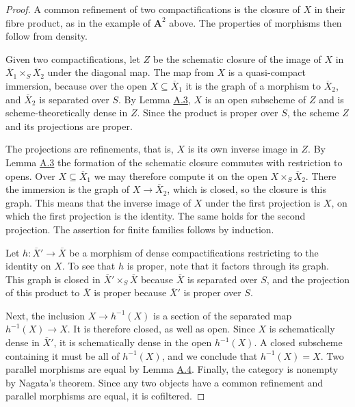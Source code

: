 \documentclass[11pt]{article}
\begin{document}
\begin{proof}[{Proof}]\label{bp20}%
A common refinement of two compactifications is the closure of \(X\) in their fibre product, as in the example of \(\mathbf A^2\) above. The properties of morphisms then follow from density.

Given two compactifications, let \(Z\) be the schematic closure of the image of \(X\) in \(\overline X_1\times_S\overline X_2\) under the diagonal map. The map from \(X\) is a quasi-compact immersion, because over the open \(X\subseteq\overline X_1\) it is the graph of a morphism to \(\overline X_2\), and \(\overline X_2\) is separated over \(S\). By Lemma \hyperref[bp9]{A.3}, \(X\) is an open subscheme of \(Z\) and is scheme-theoretically dense in \(Z\). Since the product is proper over \(S\), the scheme \(Z\) and its projections are proper.

The projections are refinements, that is, \(X\) is its own inverse image in \(Z\). By Lemma \hyperref[bp9]{A.3} the formation of the schematic closure commutes with restriction to opens. Over \(X\subseteq\overline X_1\) we may therefore compute it on the open \(X\times_S\overline X_2\). There the immersion is the graph of \(X\to\overline X_2\), which is closed, so the closure is this graph. This means that the inverse image of \(X\) under the first projection is \(X\), on which the first projection is the identity. The same holds for the second projection. The assertion for finite families follows by induction.

Let \(h:\overline X'\to\overline X\) be a morphism of dense compactifications restricting to the identity on \(X\). To see that \(h\) is proper, note that it factors through its graph. This graph is closed in \(\overline X'\times_S\overline X\) because \(\overline X\) is separated over \(S\), and the projection of this product to \(\overline X\) is proper because \(\overline X'\) is proper over \(S\).

Next, the inclusion \(X\to h^{-1}(X)\) is a section of the separated map \(h^{-1}(X)\to X\). It is therefore closed, as well as open. Since \(X\) is schematically dense in \(\overline X'\), it is schematically dense in the open \(h^{-1}(X)\). A closed subscheme containing it must be all of \(h^{-1}(X)\), and we conclude that \(h^{-1}(X)=X\). Two parallel morphisms are equal by Lemma \hyperref[bp12]{A.4}. Finally, the category is nonempty by Nagata's theorem. Since any two objects have a common refinement and parallel morphisms are equal, it is cofiltered.
\end{proof}
\end{document}
